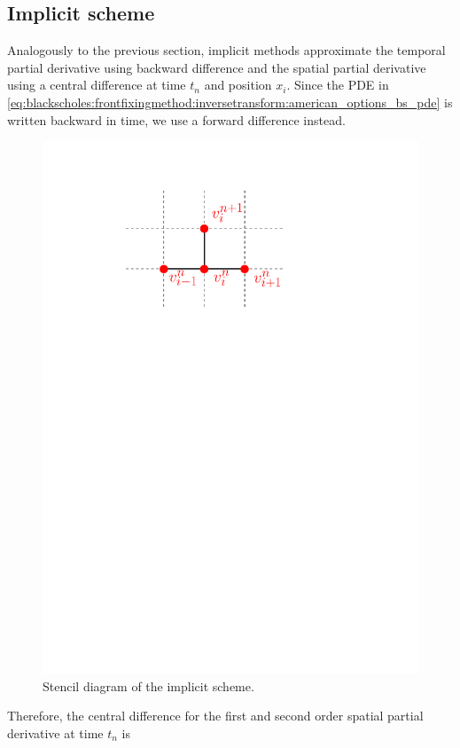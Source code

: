 \subsection{Implicit scheme}
Analogously to the previous section, implicit methods approximate the temporal partial derivative using backward difference and the spatial partial derivative using a central difference at time $t_n$ and position $x_i$. Since the PDE in \eqref{eq:blackscholes:frontfixingmethod:inversetransform:american_options_bs_pde} is written backward in time, we use a forward difference instead.
\begin{figure}[H]
  \centering
  \includegraphics[scale=.8]{chapters/chapter3/ImplicitStencil.pdf}
  \caption{Stencil diagram of the implicit scheme.}
  \label{fig:finitedifferencesschemes:implicit_stencil}
\end{figure}
Therefore, the central difference for the first and second order spatial partial derivative at time $t_n$ is 
